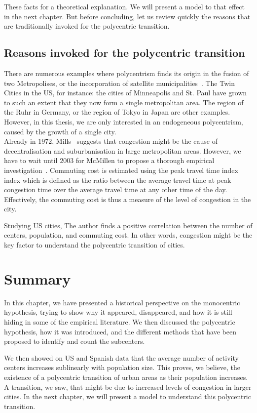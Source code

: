 These facts for a theoretical explanation. We will present a model to that
effect in the next chapter. But before concluding, let us review quickly the
reasons that are traditionally invoked for the polycentric transition.

\subsection{Reasons invoked for the polycentric transition}
\label{sec:reasons_invoked_for_the_polycentric_transition}

There are numerous examples where polycentrism finds its origin in the fusion of
two Metropolises, or the incorporation of satellite
municipalities~\cite{LeNechet:2015}. The Twin Cities in the US, for instance:
the cities of Minneapolis and St. Paul have grown to such an extent that they now
form a single metropolitan area. The region of the Ruhr in Germany, or the
region of Tokyo in Japan are other examples. However, in this thesis, we are only interested in
an endogeneous polycentrism, caused by the growth of a single city.\\

Already in $1972$, Mills~\cite{Mills:1972} suggests that congestion might be the
cause of decentralisation and suburbanisation in large metropolitan areas.
However, we have to wait until $2003$ for McMillen to propose a thorough
empirical investigation~\cite{McMillen:2003}. Commuting cost is estimated using the peak travel time index index which is
defined as the ratio between the average travel time at peak congestion time
over the average travel time at any other time of the day. Effectively, the
commuting cost is thus a measure of the level of congestion in the city. 

Studying US cities, The author finds a positive correlation between the number
of centers, population, and commuting cost.  In other words, congestion might be
the key factor to understand the polycentric transition of cities.



\section{Summary}
\label{sec:summary}

In this chapter, we have presented a historical perspective on the monocentric
hypothesis, trying to show why it appeared, disappeared, and how it is still hiding in 
some of the empirical literature. We then discussed the polycentric hypothesis,
how it was introduced, and the different methods that have been proposed to
identify and count the subcenters.

We then showed on US and Spanish data that the average number of activity
centers increases sublinearly with population size. This proves, we believe, the
existence of a polycentric transition of urban areas as their population
increases. A transition, we saw, that might be due to increased levels of
congestion in larger cities. In the next chapter, we will present a model to
understand this polycentric transition. 
